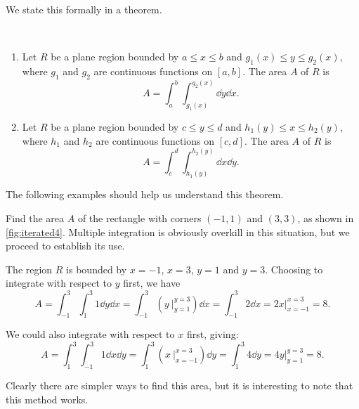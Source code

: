 We state this formally in a theorem.

\begin{theorem}\label{thm:area_plane_region}%
\mbox{}\\[-2\baselineskip]\parbox[t]{\linewidth}{%
\begin{enumerate}
	\item Let $R$ be a plane region bounded by $a\leq x\leq b$ and $g_1(x)\leq y\leq g_2(x)$, where $g_1$ and $g_2$ are continuous functions on $[a,b]$. The area $A$ of $R$ is
	\[A = \int_a^b\int_{g_1(x)}^{g_2(x)} \dd y\dd x.\]
	\item Let $R$ be a plane region bounded by $c\leq y\leq d$ and $h_1(y)\leq x\leq h_2(y)$, where $h_1$ and $h_2$ are continuous functions on $[c,d]$. The area $A$ of $R$ is
	\[A = \int_c^d\int_{h_1(y)}^{h_2(y)} \dd x\dd y.\]
\end{enumerate}}
\end{theorem}

The following examples should help us understand this theorem.

\begin{example}\label{ex_iterated4}%
Find the area $A$ of the rectangle with corners $(-1,1)$ and $(3,3)$, as shown in \autoref{fig:iterated4}.
\solution
Multiple integration is obviously overkill in this situation, but we proceed to establish its use.


The region $R$ is bounded by $x=-1$, $x=3$, $y=1$ and $y=3$. Choosing to integrate with respect to $y$ first, we have 
\[
 A = \int_{-1}^3\int_1^3 1\dd y\dd x
 = \int_{-1}^3 \left(y\ \Big|_{y=1}^{y=3}\right)\dd x
 = \int_{-1}^3 2\dd x = 2x\Big|_{x=-1}^{x=3}=8.
\]

We could also integrate with respect to $x$ first, giving:
\[
 A = \int_1^3\int_{-1}^3 1\dd x \dd y
 =\int_1^3 \left(x\ \Big|_{x=-1}^{x=3}\right)\dd y
 = \int_1^3 4\dd y = 4y\Big|_{y=1}^{y=3} = 8.
\]

Clearly there are simpler ways to find this area, but it is interesting to note that this method works.
\end{example}

